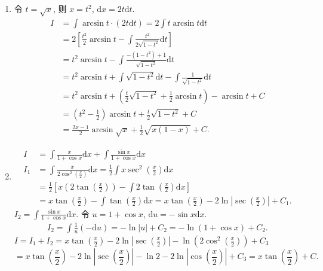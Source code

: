 \begin{solution}
\begin{enumerate}
        \item 令 $t = \sqrt{x}$, 则 $x = t^2$, $\mathrm{d}x = 2t \mathrm{d}t$.
              \begin{align*}
                  I & = \int \arcsin t \cdot (2t \mathrm{d}t) = 2 \int t \arcsin t \mathrm{d}t                            \\
                    & = 2 \left[ \frac{t^2}{2} \arcsin t - \int \frac{t^2}{2 \sqrt{1 - t^2}} \mathrm{d}t \right]          \\
                    & = t^2 \arcsin t - \int \frac{-(1 - t^2) + 1}{\sqrt{1 - t^2}} \mathrm{d}t                            \\
                    & = t^2 \arcsin t + \int \sqrt{1 - t^2} \mathrm{d}t - \int \frac{1}{\sqrt{1 - t^2}} \mathrm{d}t       \\
                    & = t^2 \arcsin t + \left( \frac{t}{2} \sqrt{1 - t^2} + \frac{1}{2} \arcsin t \right) - \arcsin t + C \\
                    & = \left(t^2 - \frac{1}{2}\right) \arcsin t + \frac{t}{2} \sqrt{1 - t^2} + C                         \\
                    & = \frac{2x - 1}{2} \arcsin \sqrt{x} + \frac{1}{2} \sqrt{x(1 - x)} + C.
              \end{align*}

        \item \begin{align*}
                  I   & = \int \frac{x}{1 + \cos x} \mathrm{d}x + \int \frac{\sin x}{1 + \cos x} \mathrm{d}x                               \\
                  I_1 & = \int \frac{x}{2 \cos^2(\frac{x}{2})} \mathrm{d}x = \frac{1}{2} \int x \sec^2(\frac{x}{2}) \mathrm{d}x            \\
                      & = \frac{1}{2} \left[ x (2 \tan(\frac{x}{2})) - \int 2 \tan(\frac{x}{2}) \mathrm{d}x \right]                        \\
                      & = x \tan(\frac{x}{2}) - \int \tan(\frac{x}{2}) \mathrm{d}x = x \tan(\frac{x}{2}) - 2 \ln|\sec(\frac{x}{2})| + C_1.
              \end{align*}
              $I_2 = \int \frac{\sin x}{1 + \cos x} \mathrm{d}x$. 令 $u = 1 + \cos x$, $\mathrm{d}u = -\sin x \mathrm{d}x$.
              \begin{align*}
                  I_2 = \int \frac{1}{u} (-\mathrm{d}u) = -\ln|u| + C_2 = -\ln(1 + \cos x) + C_2.
              \end{align*}
              $I = I_1 + I_2 = x \tan(\frac{x}{2}) - 2 \ln|\sec(\frac{x}{2})| - \ln(2\cos^2(\frac{x}{2})) + C_3$
              $$ = x \tan(\frac{x}{2}) - 2 \ln|\sec(\frac{x}{2})| - \ln 2 - 2 \ln|\cos(\frac{x}{2})| + C_3 = x \tan(\frac{x}{2}) + C. $$


\end{enumerate}
\end{solution}
